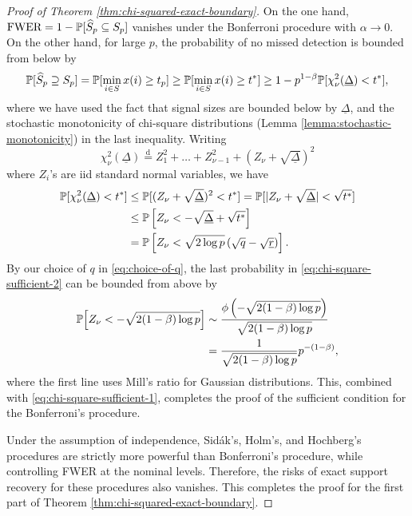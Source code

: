 \begin{proof}[Proof of Theorem \ref{thm:chi-squared-exact-boundary}]
On the one hand, $\text{FWER} = 1 - \P[\widehat{S}_p \subseteq S_p]$ vanishes under the Bonferroni procedure with $\alpha\to0$.
On the other hand, for large $p$, the probability of no missed detection is bounded from below by
\begin{equation} \label{eq:chi-square-sufficient-1}
    \P[\widehat{S}_p \supseteq S_p] 
    = \P[\min_{i\in S} x(i) \ge t_p] 
    \ge \P[\min_{i\in S} x(i) \ge t^*] 
    \ge 1 - p^{1-\beta}\P[\chi_\nu^2(\underline{\Delta}) < t^*],
\end{equation}
where we have used the fact that signal sizes are bounded below by $\underline{\Delta}$, and the stochastic monotonicity of chi-square distributions (Lemma \ref{lemma:stochastic-monotonicity}) in the last inequality.
Writing
$$
\chi_\nu^2(\underline{\Delta}) \stackrel{\mathrm{d}}{=} Z_1^2 + \ldots + Z_{\nu-1}^2 + (Z_\nu + \sqrt{\underline{\Delta}})^2
$$
where $Z_i$'s are iid standard normal variables, we have
\begin{align}
    \P[\chi_\nu^2({\underline{\Delta}}) < t^*]
    &\le \P[(Z_\nu+\sqrt{\underline{\Delta}})^2 < t^*] 
    = \P[|Z_\nu+\sqrt{\underline{\Delta}}| < \sqrt{t^*}]  \nonumber \\
    &\le \P\left[Z_\nu < - \sqrt{\underline{\Delta}} +  \sqrt{t^*}\right] \nonumber \\
    &= \P\left[Z_\nu < \sqrt{2\log{p}}\left(\sqrt{q} - \sqrt{\underline{r}}\right)\right]. \label{eq:chi-square-sufficient-2}
\end{align}
By our choice of $q$ in \eqref{eq:choice-of-q}, the last probability in \eqref{eq:chi-square-sufficient-2} can be bounded from above by 
\begin{align*}
    \P\Big[Z_\nu < -\sqrt{2(1-\beta)\log{p}}\Big]
    &\sim \frac{\phi\left(-\sqrt{2(1-\beta)\log{p}}\right)}{\sqrt{2(1-\beta)\log{p}}} \\
    &= \frac{1}{\sqrt{2(1-\beta)\log{p}}}p^{-(1-\beta)},
\end{align*}
where the first line uses Mill's ratio for Gaussian distributions.
This, combined with \eqref{eq:chi-square-sufficient-1}, completes the proof of the sufficient condition for the Bonferroni's procedure.

Under the assumption of independence, Sid\'ak's, Holm's, and Hochberg's procedures are strictly more powerful than Bonferroni's procedure, while controlling FWER at the nominal levels.
Therefore, the risks of exact support recovery for these procedures also vanishes.
This completes the proof for the first part of Theorem \ref{thm:chi-squared-exact-boundary}.


\end{proof}
